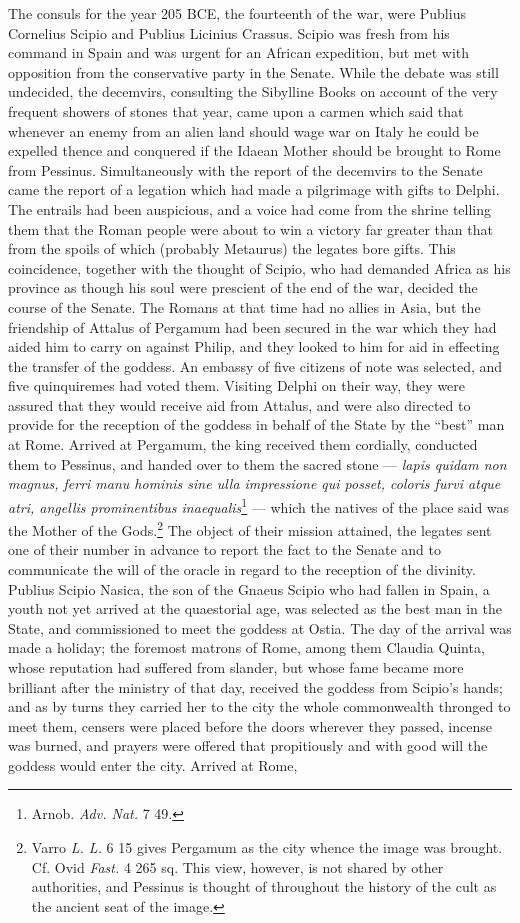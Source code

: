 \documentclass[a4paper, 11pt, oneside, polutonikogreek, english]{article}
\begin{document}
The consuls for the year 205 \textsc{BCE}, the fourteenth of the war, were Publius Cornelius Scipio and Publius Licinius Crassus. Scipio was fresh from his command in Spain and was urgent for an African expedition, but met with opposition from the conservative party in the Senate. While the debate was still undecided, the decemvirs, consulting the Sibylline Books on account of the very frequent showers of stones that year, came upon a carmen which said that whenever an enemy from an alien land should wage war on Italy he could be expelled thence and conquered if the Idaean Mother should be brought to Rome from Pessinus. Simultaneously with the report of the decemvirs to the Senate came the report of a legation which had made a pilgrimage with gifts to Delphi. The entrails had been auspicious, and a voice had come from the shrine telling them that the Roman people were about to win a victory far greater than that from the spoils of which (probably Metaurus) the legates bore gifts. This coincidence, together with the thought of Scipio, who had demanded Africa as his province as though his soul were prescient of the end of the war, decided the course of the Senate. The Romans at that time had no allies in Asia, but the friendship of Attalus of Pergamum had been secured in the war which they had aided him to carry on against Philip, and they looked to him for aid in effecting the transfer of the goddess. An embassy of five citizens of note was selected, and five quinquiremes had voted them. Visiting Delphi on their way, they were assured that they would receive aid from Attalus, and were also directed to provide for the reception of the goddess in behalf of the State by the ``best'' man at Rome. Arrived at Pergamum, the king received them cordially, conducted them to Pessinus, and handed over to them the sacred stone --- \emph{lapis quidam non magnus, ferri manu hominis sine ulla impressione qui posset, coloris furvi atque atri, angellis prominentibus inaequalis}\footnote{Arnob. \emph{Adv. Nat.} 7 49.} --- which the natives of the place said was the Mother of the Gods.\footnote{Varro \emph{L. L.} 6 15 gives Pergamum as the city whence the image was brought. Cf. Ovid \emph{Fast.} 4 265 sq. This view, however, is not shared by other authorities, and Pessinus is thought of throughout the history of the cult as the ancient seat of the image.} The object of their mission attained, the legates sent one of their number in advance to report the fact to the Senate and to communicate the will of the oracle in regard to the reception of the divinity. Publius Scipio Nasica, the son of the Gnaeus Scipio who had fallen in Spain, a youth not yet arrived at the quaestorial age, was selected as the best man in the State, and commissioned to meet the goddess at Ostia. The day of the arrival was made a holiday; the foremost matrons of Rome, among them Claudia Quinta, whose reputation had suffered from slander, but whose fame became more brilliant after the ministry of that day, received the goddess from Scipio's hands; and as by turns they carried her to the city the whole commonwealth thronged to meet them, censers were placed before the doors wherever they passed, incense was burned, and prayers were offered that propitiously and with good will the goddess would enter the city. Arrived at Rome, 
\end{document}
